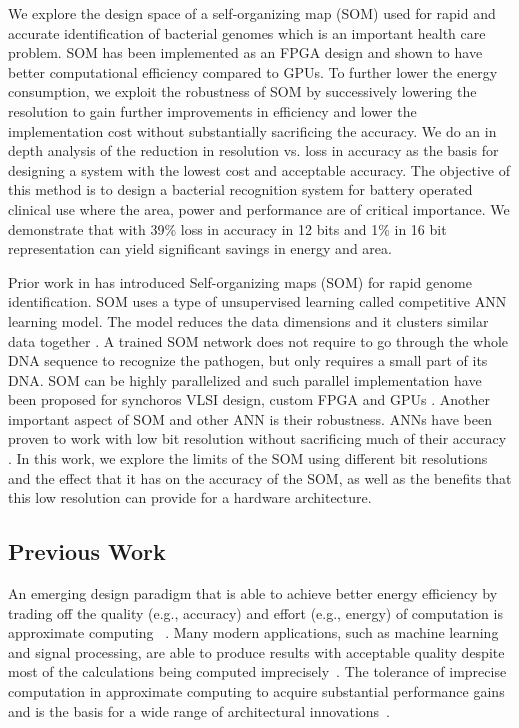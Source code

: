 \documentclass[a4paper,10pt]{article}
\begin{document}

We explore the design space of a self-organizing map (SOM) used for rapid and accurate identification of bacterial genomes which is an important health care problem.  SOM has been implemented as an FPGA design and shown to have better computational efficiency compared to GPUs. To further lower the energy consumption, we exploit the robustness of SOM by successively lowering the resolution to gain further improvements in efficiency and lower the implementation cost without substantially sacrificing the accuracy. We do an in depth analysis of the reduction in resolution vs. loss in accuracy as the basis for designing a system with the lowest cost and acceptable accuracy. The objective of this method is to design a bacterial recognition system for battery operated clinical use where the area, power and performance are of critical importance. We demonstrate that with 39\% loss in accuracy in 12 bits and 1\% in 16 bit representation can yield significant savings in energy and area.

Prior work in \cite{Yang2018RiBoSOM} has introduced Self-organizing maps (SOM) for rapid genome identification. SOM uses a type of unsupervised learning called competitive ANN learning model. The model reduces the data dimensions and it clusters similar data together \cite{Kohonen2013}. A trained SOM network does not require to go through the whole DNA sequence to recognize the pathogen, but only requires a small part of its DNA. SOM can be highly parallelized and such parallel implementation have been proposed for synchoros VLSI design, custom FPGA and GPUs \cite{Yang2018RiBoSOM, Porrmann2006, McConnell2012}. Another important aspect of SOM and other ANN is their robustness. ANNs have been proven to work with low bit resolution without sacrificing much of their accuracy \cite{8056820}. In this work, we explore the limits of the SOM using different bit resolutions and the effect that it has on the accuracy of the SOM, as well as the benefits that this low resolution can provide for a hardware architecture. 

\subsection{Previous Work}
 An emerging design paradigm that is able to achieve better energy efficiency by trading off the quality (e.g., accuracy) and effort (e.g., energy) of computation is approximate computing ~\cite{Zhang2014}. Many modern applications, such as machine learning and signal processing, are able to produce results with acceptable quality despite most of the calculations being computed imprecisely~\cite{Ye2013}. The tolerance of imprecise computation in approximate computing  to acquire substantial performance gains and is the basis for a wide range of architectural innovations~\cite{Esmaeilzadeh2012}.
\end{document}
